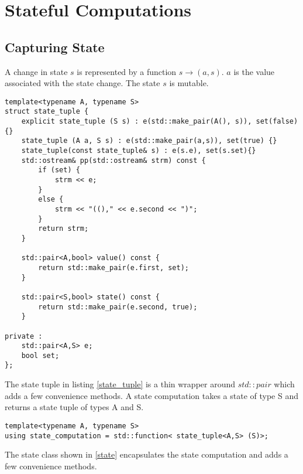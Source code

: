 \documentclass[12pt,fleqn]{article}
\begin{document}
\section{Stateful Computations}

\subsection{Capturing State}
%
%

A change in state $s$ is represented by a function $s \rightarrow (a,s)$. 
$a$ is the value associated with the state change.
The state $s$ is mutable.

%
%
%
\begin{minipage}{\linewidth}
\begin{lstlisting}[caption=state tuple, label=state_tuple]
template<typename A, typename S>
struct state_tuple {
	explicit state_tuple (S s) : e(std::make_pair(A(), s)), set(false){}
	state_tuple (A a, S s) : e(std::make_pair(a,s)), set(true) {}
	state_tuple(const state_tuple& s) : e(s.e), set(s.set){}
	std::ostream& pp(std::ostream& strm) const {
		if (set) {
			strm << e;
		}
		else {
			strm << "(()," << e.second << ")";
		}
		return strm;
	}

	std::pair<A,bool> value() const {
		return std::make_pair(e.first, set);
	}

	std::pair<S,bool> state() const {
		return std::make_pair(e.second, true);
	}

private :	
	std::pair<A,S> e;
	bool set;
};
\end{lstlisting}
\end{minipage}
%
%
%

The state tuple in listing \ref{state_tuple} is a thin wrapper around $std::pair$ which adds a few convenience methods.
A state computation takes a state of type S and returns a state tuple of types A and S.

%
%
%
\begin{minipage}{\linewidth}
\begin{lstlisting}[caption=state computation albel=state_comp]
template<typename A, typename S>
using state_computation = std::function< state_tuple<A,S> (S)>;
\end{lstlisting}
\end{minipage}
%
%
%
The state class shown in \ref{state} encapsulates the state computation and adds a few convenience methods.
\end{document}
